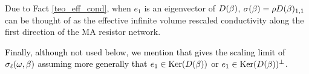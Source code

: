 \documentclass[12pt,a4paper,reqno]{amsart}
\newtheorem{Remark}[Theorem]{Remark}
\newcommand{\bbB}{{\ensuremath{\mathbb B}} }
\newcommand{\bbE}{{\ensuremath{\mathbb E}} }
\newcommand{\bbG}{{\ensuremath{\mathbb G}} }
\newcommand{\bbP}{{\ensuremath{\mathbb P}} }
\newcommand{\bbV}{{\ensuremath{\mathbb V}} }
\newcommand{\bbZ}{{\ensuremath{\mathbb Z}} }
\newcommand{\mammaL}{MA$[\b,\ell]$}
\newcommand{\rosso}{\textcolor{black}} %
\newcommand{\be}{\begin{equation}}
\newcommand{\en}{\end{equation}}
\begin{document}
Due to Fact \ref{teo_eff_cond}, when  $e_1$ is an eigenvector of $D(\beta)$, $\s(\b)=\rho\rosso{D(\b)_{1,1}}$ can be thought of as the effective infinite volume  rescaled conductivity along the first direction of the MA resistor network.

\rosso{Finally, although not used below,  we mention that \cite[Theorem~2.6]{Fhom2} gives the scaling limit of $\sigma_\ell(\omega,\beta)$ assuming more generally that $e_1\in {\rm Ker} (D(\beta))$ or $e_1\in {\rm Ker}(D(\beta))^\perp$.}



%
%
%
%
%


%
%
%
\end{document}
